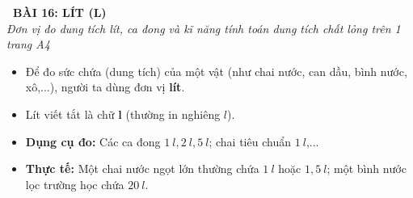\documentclass[11pt,a4paper]{article}
\begin{document}
\begin{tcolorbox}[
  enhanced,
  colback=violet!8!white,
  colframe=violet!70!black,
  arc=3mm, boxrule=1.2pt,
  left=3mm, right=3mm, top=2mm, bottom=2mm,
  halign=center
]
  {\LARGE\bfseries\color{violet!90!black}\faBookmark\ BÀI 16: LÍT (L)}\\[1mm]
  {\itshape\footnotesize\color{black!75} Đơn vị đo dung tích lít, ca đong và kĩ năng tính toán dung tích chất lỏng trên 1 trang A4}
\end{tcolorbox}

\vspace{-2mm}

\noindent
\begin{minipage}[t]{0.49\textwidth}\vspace{0pt}
\begin{tcolorbox}[
  enhanced,
  colback=violet!4!white,
  colframe=violet!75!black,
  arc=2mm, boxrule=0.8pt,
  left=2mm, right=2mm, top=1.8mm, bottom=1.8mm,
  title={\footnotesize\bfseries\color{white}\faKey\ 1. Đơn vị đo dung tích lít}
]
{\footnotesize
\begin{itemize}\setlength{\itemsep}{1pt}\setlength{\leftskip}{-2.5mm}
  \item Để đo sức chứa (dung tích) của một vật (như chai nước, can dầu, bình nước, xô,...), người ta dùng đơn vị \textbf{lít}.
  \item Lít viết tắt là chữ \textbf{l} (thường in nghiêng $l$).
  \item \textbf{Dụng cụ đo:} Các ca đong $1\ l, 2\ l, 5\ l$; chai tiêu chuẩn $1\ l$,...
  \item \textbf{Thực tế:} Một chai nước ngọt lớn thường chứa $1\ l$ hoặc $1{,}5\ l$; một bình nước lọc trường học chứa $20\ l$.
\end{itemize}
}
\end{tcolorbox}
\end{minipage}
\hfill
\end{document}
